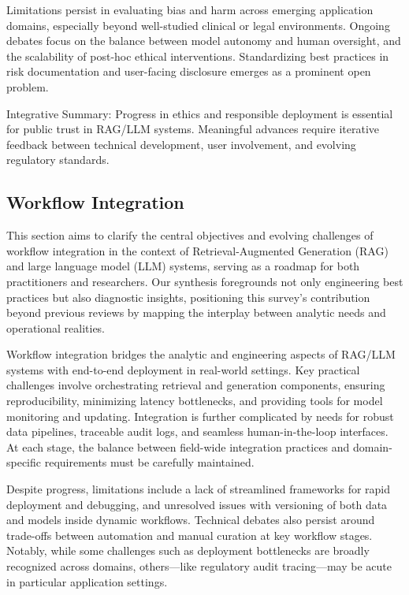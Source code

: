 \documentclass[sigconf]{acmart}
\begin{document}
Limitations persist in evaluating bias and harm across emerging application domains, especially beyond well-studied clinical or legal environments. Ongoing debates focus on the balance between model autonomy and human oversight, and the scalability of post-hoc ethical interventions. Standardizing best practices in risk documentation and user-facing disclosure emerges as a prominent open problem.

Integrative Summary: Progress in ethics and responsible deployment is essential for public trust in RAG/LLM systems. Meaningful advances require iterative feedback between technical development, user involvement, and evolving regulatory standards.

\subsection{Workflow Integration}
This section aims to clarify the central objectives and evolving challenges of workflow integration in the context of Retrieval-Augmented Generation (RAG) and large language model (LLM) systems, serving as a roadmap for both practitioners and researchers. Our synthesis foregrounds not only engineering best practices but also diagnostic insights, positioning this survey's contribution beyond previous reviews by mapping the interplay between analytic needs and operational realities.

Workflow integration bridges the analytic and engineering aspects of RAG/LLM systems with end-to-end deployment in real-world settings. Key practical challenges involve orchestrating retrieval and generation components, ensuring reproducibility, minimizing latency bottlenecks, and providing tools for model monitoring and updating. Integration is further complicated by needs for robust data pipelines, traceable audit logs, and seamless human-in-the-loop interfaces. At each stage, the balance between field-wide integration practices and domain-specific requirements must be carefully maintained.

Despite progress, limitations include a lack of streamlined frameworks for rapid deployment and debugging, and unresolved issues with versioning of both data and models inside dynamic workflows. Technical debates also persist around trade-offs between automation and manual curation at key workflow stages. Notably, while some challenges such as deployment bottlenecks are broadly recognized across domains, others---like regulatory audit tracing---may be acute in particular application settings.
\end{document}
